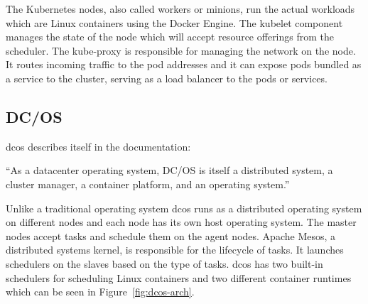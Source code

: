 The Kubernetes nodes, also called workers or minions, run the actual workloads which are Linux containers using the Docker Engine. The kubelet component manages the state of the node which will accept resource offerings from the scheduler. The kube-proxy is responsible for managing the network on the node. It routes incoming traffic to the pod addresses and it can expose pods bundled as a service to the cluster, serving as a load balancer to the pods or services. 

\subsection{DC/OS}
\label{subsec:dcos}
\Gls{dcos} describes itself in the documentation\cite{dcos_what}: 
\begin{displayquote}
``As a datacenter operating system, DC/OS is itself a distributed system, a cluster manager, a container platform, and an operating system.''
\end{displayquote} 
Unlike a traditional operating system \gls{dcos} runs as a distributed operating system on different nodes and each node has its own host operating system. The master nodes accept tasks and schedule them on the agent nodes. Apache Mesos\cite{apache_mesos}, a distributed systems kernel, is responsible for the lifecycle of tasks. It launches schedulers on the slaves based on the type of tasks. \Gls{dcos} has two built-in schedulers for scheduling Linux containers and two different container runtimes which can be seen in Figure~\ref{fig:dcos-arch}. 

